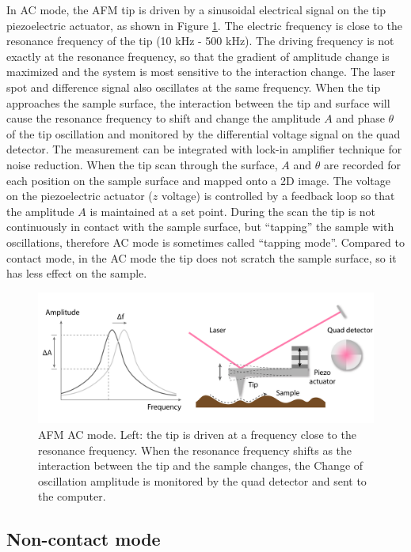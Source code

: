 \documentclass[pdflatex, sectionletters, 12pt]{pittetd}    %
\begin{document}
In AC mode, the AFM tip is driven by a sinusoidal electrical signal on the tip piezoelectric actuator, as shown in Figure \ref{FIG:ACAFM}. The electric frequency is close to the resonance frequency of the tip (10 kHz - 500 kHz). The driving frequency is not exactly at the resonance frequency, so that the gradient of amplitude change is maximized and the system is most sensitive to the interaction change. The laser spot and difference signal also oscillates at the same frequency. When the tip approaches the sample surface, the interaction between the tip and surface will cause the resonance frequency to shift and change the amplitude $A$ and phase $\theta$ of the tip oscillation and monitored by the differential voltage signal on the quad detector. The measurement can be integrated with lock-in amplifier technique for noise reduction. When the tip scan through the surface, $A$ and $\theta$ are recorded for each position on the sample surface and mapped onto a 2D image. The voltage on the piezoelectric actuator ($z$ voltage) is controlled by a feedback loop so that the amplitude $A$ is maintained at a set point. During the scan the tip is not continuously in contact with the sample surface, but ``tapping'' the sample with oscillations, therefore AC mode is sometimes called ``tapping mode''. Compared to contact mode, in the AC mode the tip does not scratch the sample surface, so it has less effect on the sample. 

\begin{figure}[h!]
	\centering
	\includegraphics[width=1.0\textwidth]{Drawing/ACAFM.pdf}
	\caption{AFM AC mode. Left: the tip is driven at a frequency close to the resonance frequency. When the resonance frequency shifts as the interaction between the tip and the sample changes, the Change of oscillation amplitude is monitored by the quad detector and sent to the computer.}
	\label{FIG:ACAFM}
\end{figure}

\subsection{Non-contact mode}
\end{document}
